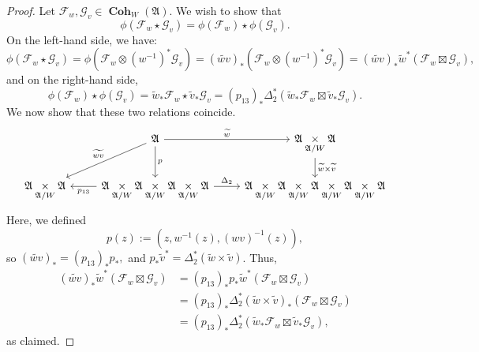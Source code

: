 \documentclass[a4paper]{report}
\theoremstyle{theorem}
\theoremstyle{definition}
\theoremstyle{remark}
\theoremstyle{proposition}
\theoremstyle{conjecture}
\theoremstyle{lemma}
\theoremstyle{corollary}
\theoremstyle{exercise}
\theoremstyle{example}
\newcommand{\mcal}{\mathcal}
\newcommand{\on}{\operatorname}
\newcommand{\coh}{\on{\mathbf{Coh}}}
\begin{document}
  \begin{proof}
      Let $\mcal{F}_w, \mcal{G}_v \in \coh_W(\mathfrak{A})$. We wish to 
      show that 
      $$\phi(\mcal{F}_w \star \mcal{G}_v) = \phi(\mcal{F}_w) \star \phi(\mcal{G}_v).$$
      On the left-hand side, we have:
      $$\phi(\mcal{F}_w \star \mcal{G}_v) = \phi(\mcal{F}_w \otimes (w^{-1})^\ast\mcal{G}_v) = (\widetilde{wv})_\ast \left(\mcal{F}_w \otimes (w^{-1})^\ast\mcal{G}_v\right) = (\widetilde{wv})_\ast \widetilde{w}^\ast (\mcal{F}_w \boxtimes \mcal{G}_v),$$
          and on the right-hand side,
          $$\phi(\mcal{F}_w) \star \phi(\mcal{G}_v) = \widetilde{w}_\ast \mcal{F}_w \star \widetilde{v}_\ast \mcal{G}_v = \left(p_{13}\right)_\ast \Delta_2^\ast(\widetilde{w}_\ast\mcal{F}_w \boxtimes \widetilde{v}_\ast\mcal{G}_v).$$
          We now show that these two relations coincide.
          $$\begin{tikzcd}
                                                   & \mathfrak{A} \arrow[r, "\widetilde{w}"] \arrow[d, "p"] \arrow[ld, "\widetilde{wv}"']                                                                             & \mathfrak{A} \underset{\mathfrak{A}/W}{\times}\mathfrak{A} \arrow[d, "\widetilde{w} \times \widetilde{v}"]                                                           \\
  \mathfrak{A} \underset{\mathfrak{A}/W}{\times}\mathfrak{A} & \mathfrak{A} \underset{\mathfrak{A}/W}{\times}\mathfrak{A}\underset{\mathfrak{A}/W}{\times}\mathfrak{A}\underset{\mathfrak{A}/W}{\times}\mathfrak{A} \arrow[l, "p_{13}"] \arrow[r, "\Delta_2"] & \mathfrak{A} \underset{\mathfrak{A}/W}{\times}\mathfrak{A}\underset{\mathfrak{A}/W}{\times}\mathfrak{A}\underset{\mathfrak{A}/W}{\times}\mathfrak{A} \underset{\mathfrak{A}/W}{\times}\mathfrak{A}
      \end{tikzcd}$$
      Here, we defined $$p(z) := (z,w^{-1}(z), (wv)^{-1}(z)),$$
      so $(\widetilde{wv})_\ast = (p_{13})_\ast p_\ast,$
      and $p_\ast\widetilde{v}^\ast = \Delta_2^\ast(\widetilde{w}\times\widetilde{v})$.
      Thus,
      \begin{align*}
          (\widetilde{wv})_\ast \widetilde{w}^\ast (\mcal{F}_w\boxtimes \mcal{G}_v) &= (p_{13})_\ast p_\ast \widetilde{w}^\ast (\mcal{F}_w \boxtimes \mcal{G}_v)\\
                                                                                    &= (p_{13})_\ast \Delta_2^\ast (\widetilde{w} \times \widetilde{v})_\ast (\mcal{F}_w \boxtimes \mcal{G}_v)\\
                                                                                    &= (p_{13})_\ast \Delta_2^\ast (\widetilde{w}_\ast\mcal{F}_w \boxtimes \widetilde{v}_\ast\mcal{G}_v),
      \end{align*}
      as claimed.
  \end{proof}
  
\end{document}
